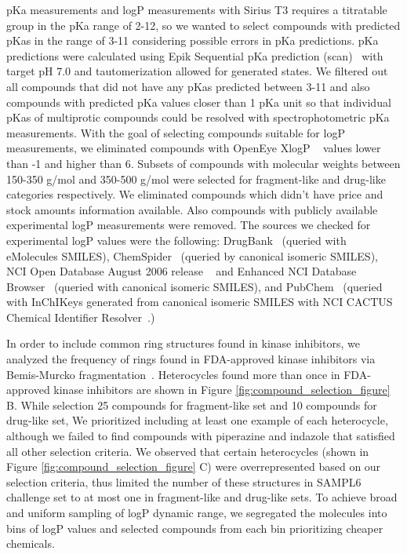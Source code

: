 \documentclass[9pt,lineno]{elife}
\begin{document}
pKa measurements and logP measurements with Sirius T3 requires a titratable group in the pKa range of 2-12, so we wanted to select compounds with predicted pKas in the range of 3-11 considering possible errors in pKa predictions. pKa predictions were calculated using Epik Sequential pKa prediction (scan)~\citep{shelley_epik:_2007,schrodinger_epik_v3_8} with target pH 7.0 and tautomerization allowed for generated states. We filtered out all compounds that did not have any pKas predicted between 3-11 and also compounds with predicted pKa values closer than 1 pKa unit so that individual pKas of multiprotic compounds could be resolved with spectrophotometric pKa measurements. With the goal of selecting compounds suitable for logP measurements, we eliminated compounds with OpenEye XlogP ~\citep{oemolprop_openeye_2017} values lower than -1 and higher than 6. 
Subsets of compounds with molecular weights between 150-350 g/mol and 350-500 g/mol were selected for fragment-like and drug-like categories respectively. We eliminated compounds which didn't have price and stock amounts information available. Also compounds with publicly available experimental logP measurements were removed. The sources we checked for experimental logP values were the following: DrugBank~\citep{wishart_drugbank:_2006} (queried with eMolecules SMILES), ChemSpider~\citep{pence_chemspider:_2010} (queried by canonical isomeric SMILES), NCI Open Database August 2006 release ~\citep{nci_open_database_2006} and Enhanced NCI Database Browser~\citep{nci_database_browser} (queried with canonical isomeric SMILES), and PubChem~\citep{kim_pubchem_2016} (queried with InChIKeys generated from canonical isomeric SMILES with NCI CACTUS Chemical Identifier Resolver~\citep{nci_chem_id_resolver}.)

In order to include common ring structures found in kinase inhibitors, we analyzed the frequency of rings found in FDA-approved kinase inhibitors via Bemis-Murcko fragmentation~\citep{bemis_properties_1996, oemedchemtk_openeye_2017}. Heterocycles found more than once in FDA-approved kinase inhibitors are shown in Figure \ref{fig:compound_selection_figure} B. 
While selection 25 compounds for fragment-like set and 10 compounds for drug-like set, We prioritized including at least one example of each heterocycle, although we failed to find compounds with piperazine and indazole that satisfied all other selection criteria. We observed that certain heterocycles (shown in Figure \ref{fig:compound_selection_figure} C) were overrepresented based on our selection criteria, thus limited the number of these structures in SAMPL6 challenge set to at most one in fragment-like and drug-like sets. To achieve broad and uniform sampling of logP dynamic range, we segregated the molecules into bins of logP values and selected compounds from each bin prioritizing cheaper chemicals. 
\end{document}
